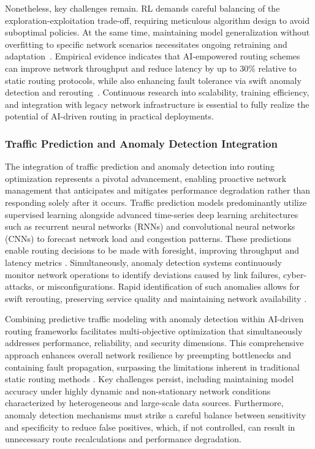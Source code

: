 \documentclass[sigconf]{acmart}
\begin{document}
Nonetheless, key challenges remain. RL demands careful balancing of the exploration-exploitation trade-off, requiring meticulous algorithm design to avoid suboptimal policies. At the same time, maintaining model generalization without overfitting to specific network scenarios necessitates ongoing retraining and adaptation~\cite{ref53}. Empirical evidence indicates that AI-empowered routing schemes can improve network throughput and reduce latency by up to 30\% relative to static routing protocols, while also enhancing fault tolerance via swift anomaly detection and rerouting~\cite{ref4}. Continuous research into scalability, training efficiency, and integration with legacy network infrastructure is essential to fully realize the potential of AI-driven routing in practical deployments.

\subsubsection{Traffic Prediction and Anomaly Detection Integration}

The integration of traffic prediction and anomaly detection into routing optimization represents a pivotal advancement, enabling proactive network management that anticipates and mitigates performance degradation rather than responding solely after it occurs. Traffic prediction models predominantly utilize supervised learning alongside advanced time-series deep learning architectures such as recurrent neural networks (RNNs) and convolutional neural networks (CNNs) to forecast network load and congestion patterns. These predictions enable routing decisions to be made with foresight, improving throughput and latency metrics \cite{ref50}. Simultaneously, anomaly detection systems continuously monitor network operations to identify deviations caused by link failures, cyber-attacks, or misconfigurations. Rapid identification of such anomalies allows for swift rerouting, preserving service quality and maintaining network availability \cite{ref53}.

Combining predictive traffic modeling with anomaly detection within AI-driven routing frameworks facilitates multi-objective optimization that simultaneously addresses performance, reliability, and security dimensions. This comprehensive approach enhances overall network resilience by preempting bottlenecks and containing fault propagation, surpassing the limitations inherent in traditional static routing methods \cite{ref53}. Key challenges persist, including maintaining model accuracy under highly dynamic and non-stationary network conditions characterized by heterogeneous and large-scale data sources. Furthermore, anomaly detection mechanisms must strike a careful balance between sensitivity and specificity to reduce false positives, which, if not controlled, can result in unnecessary route recalculations and performance degradation.
\end{document}
